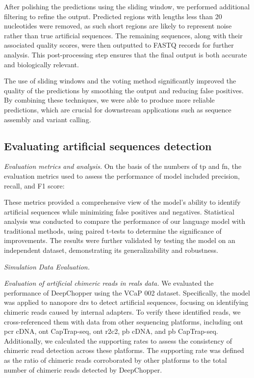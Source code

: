 \documentclass[pdflatex, sn-mathphys-num, lineno]{sn-jnl}%
\theoremstyle{thmstyleone}%
\theoremstyle{thmstyletwo}%
\theoremstyle{thmstylethree}%
\begin{document}
After polishing the predictions using the sliding window, we performed additional filtering to refine the output.
Predicted regions with lengths less than 20 nucleotides were removed, as such short regions are likely to represent noise rather than true artificial sequences.
The remaining sequences, along with their associated quality scores, were then outputted to FASTQ records for further analysis.
This post-processing step ensures that the final output is both accurate and biologically relevant.

The use of sliding windows and the voting method significantly improved the quality of the predictions by smoothing the output and reducing false positives.
By combining these techniques, we were able to produce more reliable predictions, which are crucial for downstream applications such as sequence assembly and variant calling.



\subsection{Evaluating artificial sequences detection}

\textit{Evaluation metrics and analysis.} On the basis of the numbers of \gls{tp} and \gls{fn}, the evaluation metrics used to assess the performance of  model included precision, recall, and F1 score:

These metrics provided a comprehensive view of the model's ability to identify artificial sequences while minimizing false positives and negatives.
Statistical analysis was conducted to compare the performance of our language model with traditional methods, using paired t-tests to determine the significance of improvements.
The results were further validated by testing the model on an independent dataset, demonstrating its generalizability and robustness.


\textit{Simulation Data Evaluation.}


\textit{Evaluation of artificial chimeric reads in reals data.}  We evaluated the performance of DeepChopper using the VCaP 002 dataset.
Specifically, the model was applied to nanopore \gls{drs} to detect artificial sequences, focusing on identifying chimeric reads caused by internal adapters.
To verify these identified reads, we cross-referenced them with data from other sequencing platforms, including \gls{ont} \gls{pcr} cDNA, \gls{ont} CapTrap-seq, \gls{ont} \gls{r2c2}, \gls{pb} cDNA, and \gls{pb} CapTrap-seq.
Additionally, we calculated the supporting rates to assess the consistency of chimeric read detection across these platforms.
The supporting rate was defined as the ratio of chimeric reads corroborated by other platforms to the total number of chimeric reads detected by DeepChopper.
\end{document}
